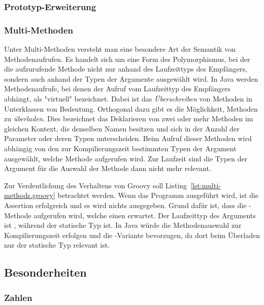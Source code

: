 	\subsubsection{Prototyp-Erweiterung}

	\subsubsection{Multi-Methoden}

	Unter Multi-Methoden versteht man eine besondere Art der Semantik von Methodenaufrufen.
	Es handelt sich um eine Form des Polymorphismus, bei der die aufzurufende Methode nicht nur anhand des Laufzeittyps des Empfängers, sondern auch anhand der Typen der Argumente ausgewählt wird.
	In Java werden Methodenaufrufe, bei denen der Aufruf vom Laufzeittyp des Empfängers abhängt, als "virtuell" bezeichnet.
	Dabei ist das \emph{Überschreiben} von Methoden in Unterklassen von Bedeutung.
	Orthogonal dazu gibt es die Möglichkeit, Methoden zu \emph{überladen}.
	Dies bezeichnet das Deklarieren von zwei oder mehr Methoden im gleichen Kontext, die denselben Namen besitzen und sich in der Anzahl der Parameter oder deren Typen unterscheiden.
	Beim Aufruf dieser Methoden wird abhängig von den zur Kompilierungszeit bestimmten Typen der Argument ausgewählt, welche Methode aufgerufen wird.
	Zur Laufzeit sind die Typen der Argument für die Auswahl der Methode dann nicht mehr relevant.


	Zur Verdeutlichung des Verhaltens von Groovy soll Listing~\ref{lst:multi-methods.groovy} betrachtet werden.
	Wenn das Programm ausgeführt wird, ist die Assertion erfolgreich und es wird nichts ausgegeben.
	Grund dafür ist, dass die -Methode aufgerufen wird, welche einen  erwartet.
	Der Laufzeittyp des Arguments  ist , während der statische Typ  ist.
	In Java würde die Methodenauswahl zur Kompilierungszeit erfolgen und die -Variante bevorzugen, da dort beim Überladen nur der statische Typ relevant ist.

	\subsection{Besonderheiten}\label{subsec:besonderheiten}

	\subsubsection{Zahlen}

